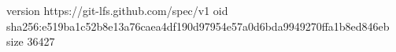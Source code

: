 version https://git-lfs.github.com/spec/v1
oid sha256:e519ba1c52b8e13a76caea4df190d97954e57a0d6bda9949270ffa1b8ed846eb
size 36427
